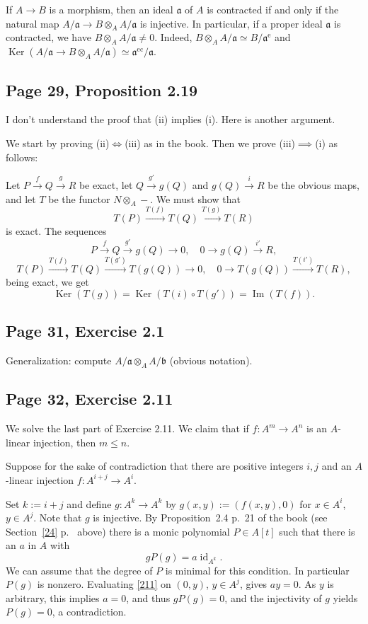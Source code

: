 \documentclass[parskip=half,fontsize=12pt]{scrartcl}%
\newcommand{\oo}{\operatorname}\newcommand{\ooo}{\operatorname*}
\newcommand{\mf}{\mathfrak}
\newcommand{\aaa}{\mf a}
\newcommand{\bbb}{\mf b}
\newcommand{\Ker}{\operatorname{Ker}}\newcommand{\Coker}{\operatorname{Coker}}
\newcommand{\xr}{\xrightarrow}
\begin{document}
If $A\to B$ is a morphism, then an ideal $\aaa$ of $A$ is contracted if and only if the natural map $A/\aaa\to B\otimes_A A/\aaa$ is injective. In particular, if a proper ideal $\aaa$ is contracted, we have $B\otimes_A A/\aaa\ne0$. Indeed, $B\otimes_A A/\aaa\simeq B/\aaa^{\oo e}$ and $\oo{Ker}(A/\aaa\to B\otimes_A A/\aaa)\simeq\aaa^{\oo{ec}}/\aaa$. %

\subsection{Page 29, Proposition 2.19}%

I don't understand the proof that (ii) implies (i). Here is another argument.

We start by proving (ii)$\iff$(iii) as in the book. Then we prove (iii)$\implies$(i) as follows:

Let $P\xr fQ\xr gR$ be exact, let $Q\xr{g'}g(Q)$ and $g(Q)\xr iR$ be the obvious maps, and let $T$ be the functor $N\otimes_A-$. We must show that 
$$
T(P)\xr{T(f)}T(Q)\xr{T(g)}T(R)
$$ 
is exact. The sequences 
$$
P\xr fQ\xr{g'}g(Q)\to0,\quad0\to g(Q)\xr{i'}R,
$$ 
$$
T(P)\xr{T(f)}T(Q)\xr{T(g')}T(g(Q))\to0,\quad0\to T(g(Q))\xr{T(i')}T(R),
$$ 
being exact, we get 
$$
\Ker(T(g))=\Ker(T(i)\circ T(g'))=\oo{Im}(T(f)).
$$

\subsection{Page 31, Exercise 2.1}%

Generalization: compute $A/\aaa\otimes_AA/\bbb$ (obvious notation).

\subsection{Page 32, Exercise 2.11}%

We solve the last part of Exercise 2.11. We claim that if $f:A^m\to A^n$ is an $A$-linear injection, then $m\le n$. 

Suppose for the sake of contradiction that there are positive integers $i,j$ and an $A$-linear injection $f:A^{i+j}\to A^i$. 

Set $k:=i+j$ and define $g:A^k\to A^k$ by $g(x,y):=(f(x,y),0)$ for $x\in A^i$, $y\in A^j$. Note that $g$ is injective. By Proposition~2.4 p.~21 of the book (see Section~\ref{24} p.~\pageref{24} above) there is a monic polynomial $P\in A[t]$ such that there is an $a$ in $A$ with 
\begin{equation}\label{211}
gP(g)=a\oo{id}_{A^k}.
\end{equation} 
We can assume that the degree of $P$ is minimal for this condition. In particular $P(g)$ is nonzero. Evaluating \eqref{211} on $(0,y)$, $y\in A^j$, gives $ay=0$. As $y$ is arbitrary, this implies $a=0$, and thus $gP(g)=0$, and the injectivity of $g$ yields $P(g)=0$, a contradiction. 
\end{document}
